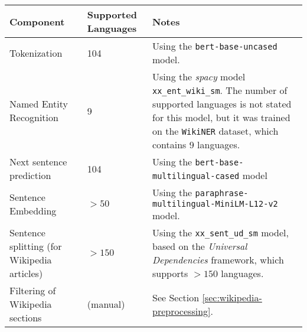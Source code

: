 {
\renewcommand{\arraystretch}{1.5}  %
\begin{table}[H]
	\centering
	\begin{tabularx}{\textwidth}{|X|X|X|}
		\hline
		\textbf{Component}                          & \textbf{Supported Languages} & \textbf{Notes}                                                                                                                                                                                                                             \\
		\hline
		Tokenization                                & 104                          & Using the \texttt{bert-base-uncased} model\footnotemark[1].                                                                                                                                                                                 \\
		\hline
		Named Entity Recognition                    & 9                            & Using the \textit{spacy} model \texttt{xx\_ent\_wiki\_sm}\footnotemark[2]. The number of supported languages is not stated for this model, but it was trained on the \texttt{WikiNER} dataset\footnotemark[3], which contains 9 languages. \\
		\hline
		Next sentence prediction                    & 104                          & Using the \texttt{bert-base-multilingual-cased} model\footnotemark[4]                                                                                                                                                                      \\
		\hline
		Sentence Embedding                          & $>50$                        & Using the \texttt{paraphrase-multilingual-MiniLM-L12-v2} model\footnotemark[5].                                                                                                                                                             \\
		\hline
		Sentence splitting (for Wikipedia articles) & $>150$                       & Using the \texttt{xx\_sent\_ud\_sm} model\footnotemark[6], based on the \textit{Universal Dependencies} framework\footnotemark[7], which supports $>150$ languages.                                                                        \\
		\hline
		Filtering of Wikipedia sections             & (manual)                     & See Section \ref{sec:wikipedia-preprocessing}.                                                                                                                                                                                              \\

\end{tabularx}
\end{table}}
